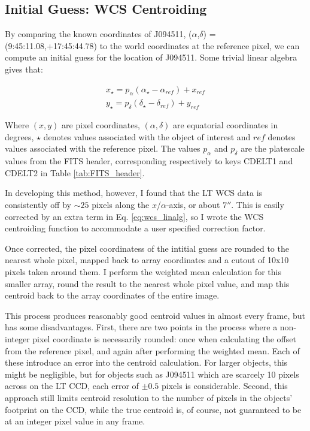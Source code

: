 \documentclass[a4paper,11pt]{article}
\begin{document}
\subsection{Initial Guess: WCS Centroiding}\label{sec:wcs_centroid}

By comparing the known coordinates of J094511, ($\alpha$,$ \delta$) = (9:45:11.08,+17:45:44.78) to the world coordinates at the reference pixel, we can compute an initial guess for the location of J094511. Some trivial linear algebra gives that:

\begin{align}
    x_\star = p_\alpha(\alpha_\star - \alpha_{ref}) + x_{ref} \\
    y_\star = p_\delta(\delta_\star - \delta_{ref}) + y_{ref}
    \label{eq:wcs_linalg}
\end{align}

\noindent Where $(x,y)$ are pixel coordinates, $(\alpha,\delta)$ are equatorial coordinates in degrees, $\star$ denotes values associated with the object of interest and $ref$ denotes values associated with the reference pixel. The values $p_\alpha$ and $p_\delta$ are the platescale values from the FITS header, corresponding respectively to keys CDELT1 and CDELT2 in Table \ref{tab:FITS_header}.

In developing this method, however, I found that the LT WCS data is consistently off by $\sim25$ pixels along the $x$/$\alpha$-axis, or about $7''$. This is easily corrected by an extra term in Eq. \ref{eq:wcs_linalg}, so I wrote the WCS centroiding function to accommodate a user specified correction factor.

Once corrected, the pixel coordinatess of the intitial guess are rounded to the nearest whole pixel, mapped back to array coordinates and a cutout of 10x10 pixels taken around them. I perform the weighted mean calculation for this smaller array, round the result to the nearest whole pixel value, and map this centroid back to the array coordinates of the entire image.

This process produces reasonably good centroid values in almost every frame, but has some disadvantages. First, there are two points in the process where a non-integer pixel coordinate is necessarily rounded: once when calculating the offset from the reference pixel, and again after performing the weighted mean. Each of these introduce an error into the centroid calculation. For larger objects, this might be negligible, but for objects such as J094511 which are scarcely 10 pixels across on the LT CCD, each error of $\pm0.5$ pixels is considerable. Second, this approach still limits centroid resolution to the number of pixels in the objects' footprint on the CCD, while the true centroid is, of course, not guaranteed to be at an integer pixel value in any frame.
\end{document}
